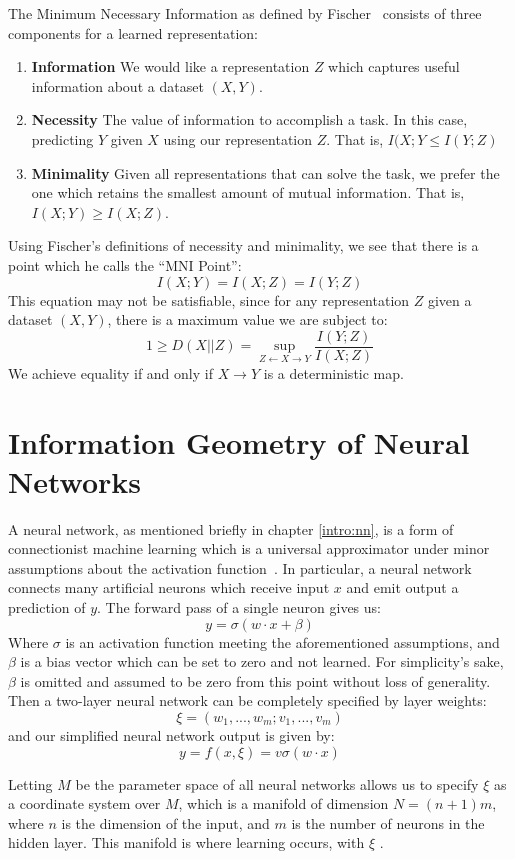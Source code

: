 The Minimum Necessary Information as defined by Fischer~\cite{fischer2020conditional} consists of three components for a learned representation:
\begin{enumerate}
	\item \textbf{Information} We would like a representation $Z$ which captures useful information about a dataset $(X, Y)$.
	\item \textbf{Necessity} The value of information to accomplish a task. In this case, predicting $Y$ given $X$ using our representation $Z$. That is, $I(X; Y \leq I(Y; Z)$
	\item \textbf{Minimality} Given all representations that can solve the task, we prefer the one which retains the smallest amount of mutual information. That is, $I(X; Y) \geq I(X; Z)$.
\end{enumerate}
Using Fischer's definitions of necessity and minimality, we see that there is a point which he calls the ``MNI Point'':
$$I(X; Y) = I(X; Z) = I(Y; Z)$$
This equation may not be satisfiable, since for any representation $Z$ given a dataset $(X, Y)$, there is a maximum value we are subject to:
$$1 \geq D(X||Z) = \sup_{Z \leftarrow X \rightarrow Y}\frac{I(Y; Z)}{I(X; Z)}$$
We achieve equality if and only if $X \to Y$ is a deterministic map.

\section{Information Geometry of Neural Networks}
A neural network, as mentioned briefly in chapter \ref{intro:nn}, is a form of connectionist machine learning which is a universal approximator under minor assumptions about the activation function~\cite{goodfellow2016deep}.
In particular, a neural network connects many artificial neurons which receive input $x$ and emit output a prediction of $y$. 
The forward pass of a single neuron gives us:
$$y = \sigma(w \cdot x + \beta)$$
Where $\sigma$ is an activation function meeting the aforementioned assumptions, and $\beta$ is a bias vector which can be set to zero and not learned.
For simplicity's sake, $\beta$ is omitted and assumed to be zero from this point without loss of generality.
Then a two-layer neural network can be completely specified by layer weights:
$$\xi = (w_1, ..., w_m; v_1, ..., v_m)$$
and our simplified neural network output is given by:
$$y = f(x, \xi) = v\sigma(w \cdot x)$$

Letting $M$ be the parameter space of all neural networks allows us to specify $\xi$ as a coordinate system over $M$, which is a manifold of dimension $N=(n+1)m$, where $n$ is the dimension of the input, and $m$ is the number of neurons in the hidden layer.
This manifold is where learning occurs, with $\xi$ . 

